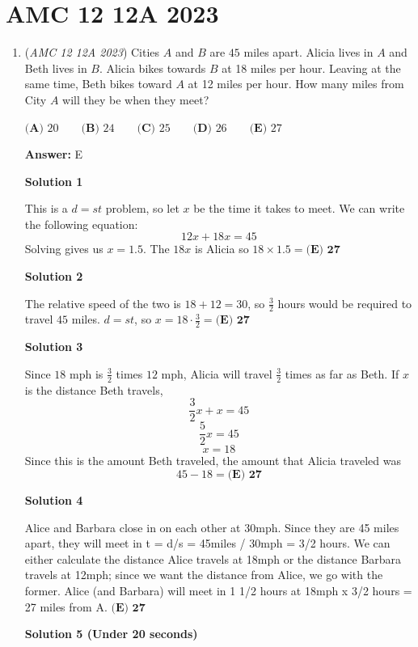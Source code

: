 \section{AMC 12 12A 2023}
        \begin{enumerate}
        	\item (\textit{AMC 12 12A 2023}) Cities $A$ and $B$ are $45$ miles apart. Alicia lives in $A$ and Beth lives in $B$. Alicia bikes towards $B$ at 18 miles per hour. Leaving at the same time, Beth bikes toward $A$ at 12 miles per hour. How many miles from City $A$ will they be when they meet?


 $\textbf{(A) }20\qquad\textbf{(B) }24\qquad\textbf{(C) }25\qquad\textbf{(D) }26\qquad\textbf{(E) }27$

 \textbf{Answer: }E



\textbf{Solution 1}

This is a $d=st$ problem, so let $x$ be the time it takes to meet. We can write the following equation:
 \[12x+18x=45\]Solving gives us $x=1.5$. The $18x$ is Alicia so $18\times1.5=\boxed{\textbf{(E) 27}}$




\textbf{Solution 2}

The relative speed of the two is $18+12=30$, so $\frac{3}{2}$ hours would be required to travel $45$ miles. $d=st$, so $x=18\cdot\frac{3}{2}=\boxed{\textbf{(E) 27}}$




\textbf{Solution 3}

Since $18$ mph is $\frac{3}{2}$ times $12$ mph, Alicia will travel $\frac{3}{2}$ times as far as Beth. If $x$ is the distance Beth travels, 
 \[\frac{3}{2}x+x=45\] 
 \[\frac{5}{2}x=45\] 
 \[x=18\]Since this is the amount Beth traveled, the amount that Alicia traveled was 
 \[45-18=\boxed{\textbf{(E) 27}}\]




\textbf{Solution 4}

Alice and Barbara close in on each other at 30mph. Since they are 45 miles apart, they will meet in t = d/s = 45miles / 30mph = 3/2 hours. We can either calculate the distance Alice travels at 18mph or the distance Barbara travels at 12mph; since we want the distance from Alice, we go with the former. Alice (and Barbara) will meet in 1 1/2 hours at 18mph x 3/2 hours = 27 miles from A. $\boxed{\textbf{(E) 27}}$




\textbf{Solution 5 (Under 20 seconds)}


\end{enumerate}
